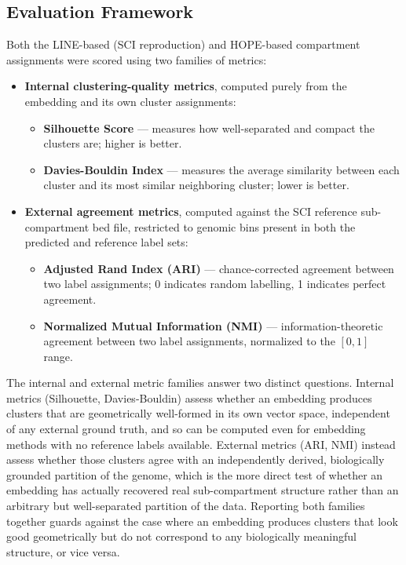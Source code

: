 \documentclass[12pt]{article}
\begin{document}
\subsection{Evaluation Framework}
Both the LINE-based (SCI reproduction) and HOPE-based compartment assignments were scored
using two families of metrics:

\begin{itemize}
    \item \textbf{Internal clustering-quality metrics}, computed purely from the embedding and
    its own cluster assignments:
    \begin{itemize}
        \item \textbf{Silhouette Score} — measures how well-separated and compact the clusters are;
        higher is better.
        \item \textbf{Davies-Bouldin Index} — measures the average similarity between each cluster
        and its most similar neighboring cluster; lower is better.
    \end{itemize}
    \item \textbf{External agreement metrics}, computed against the SCI reference sub-compartment
    bed file, restricted to genomic bins present in both the predicted and reference label sets:
    \begin{itemize}
        \item \textbf{Adjusted Rand Index (ARI)} — chance-corrected agreement between two
        label assignments; 0 indicates random labelling, 1 indicates perfect agreement.
        \item \textbf{Normalized Mutual Information (NMI)} — information-theoretic agreement
        between two label assignments, normalized to the $[0,1]$ range.
    \end{itemize}
\end{itemize}

The internal and external metric families answer two distinct questions. Internal metrics
(Silhouette, Davies-Bouldin) assess whether an embedding produces clusters that are geometrically
well-formed in its own vector space, independent of any external ground truth, and so can be
computed even for embedding methods with no reference labels available. External metrics (ARI,
NMI) instead assess whether those clusters agree with an independently derived, biologically
grounded partition of the genome, which is the more direct test of whether an embedding has
actually recovered real sub-compartment structure rather than an arbitrary but well-separated
partition of the data. Reporting both families together guards against the case where an
embedding produces clusters that look good geometrically but do not correspond to any
biologically meaningful structure, or vice versa.
\end{document}
